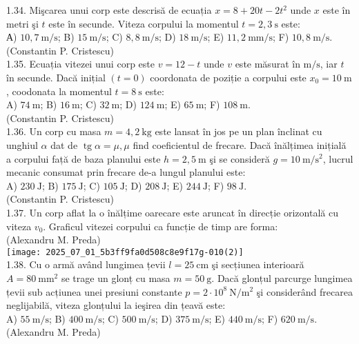 1.34. Mişcarea unui corp este descrisă de ecuația $x=8+20 t-2 t^{2}$ unde $x$ este în metri şi $t$ este în secunde. Viteza corpului la momentul $t=2,3 \mathrm{~s}$ este:\\ А) $10,7 \mathrm{~m} / \mathrm{s}$; B) $15 \mathrm{~m} / \mathrm{s}$; C) $8,8 \mathrm{~m} / \mathrm{s}$; D) $18 \mathrm{~m} / \mathrm{s}$; E) $11,2 \mathrm{~mm} / \mathrm{s}$; F) $10,8 \mathrm{~m} / \mathrm{s}$.\\ (Constantin P. Cristescu)\\

1.35. Ecuația vitezei unui corp este $v=12-t$ unde $v$ este măsurat în $\mathrm{m} / \mathrm{s}$, iar $t$ în secunde. Dacă inițial $(t=0)$ coordonata de poziție a corpului este $x_{0}=10 \mathrm{~m}$, coodonata la momentul $t=8 \mathrm{~s}$ este:\\ A) $74 \mathrm{~m}$; B) $16 \mathrm{~m}$; C) $32 \mathrm{~m}$; D) $124 \mathrm{~m}$; E) $65 \mathrm{~m}$; F) $108 \mathrm{~m}$.\\ (Constantin P. Cristescu)\\

1.36. Un corp cu masa $m=4,2 \mathrm{~kg}$ este lansat în jos pe un plan înclinat cu unghiul $\alpha$ dat de $\operatorname{tg} \alpha=\mu, \mu$ find coeficientul de frecare. Dacă înălțimea inițială a corpului față de baza planului este $h=2,5 \mathrm{~m}$ şi se consideră $g=10 \mathrm{~m} / \mathrm{s}^{2}$, lucrul mecanic consumat prin frecare de-a lungul planului este:\\ A) $230 \mathrm{~J}$; B) $175 \mathrm{~J}$; C) $105 \mathrm{~J}$; D) $208 \mathrm{~J}$; E) $244 \mathrm{~J}$; F) $98 \mathrm{~J}$.\\ (Constantin P. Cristescu)\\

1.37. Un corp aflat la o înălțime oarecare este aruncat în direcție orizontală cu viteza $v_{0}$. Graficul vitezei corpului ca funcție de timp are forma:\\ (Alexandru M. Preda)\\ \texttt{[image: 2025\_07\_01\_5b3ff9fa0d508c8e9f17g-010(2)]}\\

1.38. Cu o armă având lungimea țevii $l=25 \mathrm{~cm}$ şi secțiunea interioară $A=80 \mathrm{~mm}^{2}$ se trage un glonț cu masa $m=50 \mathrm{~g}$. Dacă glonțul parcurge lungimea țevii sub acțiunea unei presiuni constante $p=2 \cdot 10^{8} \mathrm{~N} / \mathrm{m}^{2}$ şi considerând frecarea neglijabilă, viteza glonțului la ieşirea din țeavă este:\\ A) $55 \mathrm{~m} / \mathrm{s}$; B) $400 \mathrm{~m} / \mathrm{s}$; C) $500 \mathrm{~m} / \mathrm{s}$; D) $375 \mathrm{~m} / \mathrm{s}$; E) $440 \mathrm{~m} / \mathrm{s}$; F) $620 \mathrm{~m} / \mathrm{s}$.\\ (Alexandru M. Preda)\\

